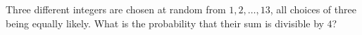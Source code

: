 Three different integers are chosen at random from $1,2,\dots,13$, all choices of three being equally likely. What is the probability that their sum is divisible by $4$?
